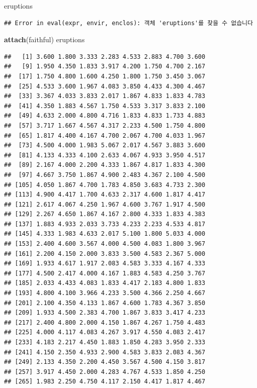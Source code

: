 \documentclass[11pt,]{krantz}
\makeatletter
\newenvironment{Shaded}{\begin{snugshade}}{\end{snugshade}}
\newcommand{\KeywordTok}[1]{\textcolor[rgb]{0.13,0.29,0.53}{\textbf{#1}}}
\newcommand{\NormalTok}[1]{#1}
\newenvironment{kframe}{%
\medskip{}
\setlength{\fboxsep}{.8em}
 \def\at@end@of@kframe{}%
 \ifinner\ifhmode%
  \def\at@end@of@kframe{\end{minipage}}%
  \begin{minipage}{\columnwidth}%
 \fi\fi%
 \def\FrameCommand##1{\hskip\@totalleftmargin \hskip-\fboxsep
 \colorbox{shadecolor}{##1}\hskip-\fboxsep
     \hskip-\linewidth \hskip-\@totalleftmargin \hskip\columnwidth}%
 \MakeFramed {\advance\hsize-\width
   \@totalleftmargin\z@ \linewidth\hsize
   \@setminipage}}%
 {\par\unskip\endMakeFramed%
 \at@end@of@kframe}
\renewenvironment{Shaded}{\begin{kframe}}{\end{kframe}}
\theoremstyle{definition}
\theoremstyle{definition}
\theoremstyle{remark}
\makeatother
\begin{document}
\begin{Shaded}
\begin{Highlighting}[]
\NormalTok{eruptions}
\end{Highlighting}
\end{Shaded}

\begin{verbatim}
## Error in eval(expr, envir, enclos): 객체 'eruptions'를 찾을 수 없습니다
\end{verbatim}

\begin{Shaded}
\begin{Highlighting}[]
\KeywordTok{attach}\NormalTok{(faithful)}
\NormalTok{eruptions}
\end{Highlighting}
\end{Shaded}

\begin{verbatim}
##   [1] 3.600 1.800 3.333 2.283 4.533 2.883 4.700 3.600
##   [9] 1.950 4.350 1.833 3.917 4.200 1.750 4.700 2.167
##  [17] 1.750 4.800 1.600 4.250 1.800 1.750 3.450 3.067
##  [25] 4.533 3.600 1.967 4.083 3.850 4.433 4.300 4.467
##  [33] 3.367 4.033 3.833 2.017 1.867 4.833 1.833 4.783
##  [41] 4.350 1.883 4.567 1.750 4.533 3.317 3.833 2.100
##  [49] 4.633 2.000 4.800 4.716 1.833 4.833 1.733 4.883
##  [57] 3.717 1.667 4.567 4.317 2.233 4.500 1.750 4.800
##  [65] 1.817 4.400 4.167 4.700 2.067 4.700 4.033 1.967
##  [73] 4.500 4.000 1.983 5.067 2.017 4.567 3.883 3.600
##  [81] 4.133 4.333 4.100 2.633 4.067 4.933 3.950 4.517
##  [89] 2.167 4.000 2.200 4.333 1.867 4.817 1.833 4.300
##  [97] 4.667 3.750 1.867 4.900 2.483 4.367 2.100 4.500
## [105] 4.050 1.867 4.700 1.783 4.850 3.683 4.733 2.300
## [113] 4.900 4.417 1.700 4.633 2.317 4.600 1.817 4.417
## [121] 2.617 4.067 4.250 1.967 4.600 3.767 1.917 4.500
## [129] 2.267 4.650 1.867 4.167 2.800 4.333 1.833 4.383
## [137] 1.883 4.933 2.033 3.733 4.233 2.233 4.533 4.817
## [145] 4.333 1.983 4.633 2.017 5.100 1.800 5.033 4.000
## [153] 2.400 4.600 3.567 4.000 4.500 4.083 1.800 3.967
## [161] 2.200 4.150 2.000 3.833 3.500 4.583 2.367 5.000
## [169] 1.933 4.617 1.917 2.083 4.583 3.333 4.167 4.333
## [177] 4.500 2.417 4.000 4.167 1.883 4.583 4.250 3.767
## [185] 2.033 4.433 4.083 1.833 4.417 2.183 4.800 1.833
## [193] 4.800 4.100 3.966 4.233 3.500 4.366 2.250 4.667
## [201] 2.100 4.350 4.133 1.867 4.600 1.783 4.367 3.850
## [209] 1.933 4.500 2.383 4.700 1.867 3.833 3.417 4.233
## [217] 2.400 4.800 2.000 4.150 1.867 4.267 1.750 4.483
## [225] 4.000 4.117 4.083 4.267 3.917 4.550 4.083 2.417
## [233] 4.183 2.217 4.450 1.883 1.850 4.283 3.950 2.333
## [241] 4.150 2.350 4.933 2.900 4.583 3.833 2.083 4.367
## [249] 2.133 4.350 2.200 4.450 3.567 4.500 4.150 3.817
## [257] 3.917 4.450 2.000 4.283 4.767 4.533 1.850 4.250
## [265] 1.983 2.250 4.750 4.117 2.150 4.417 1.817 4.467
\end{verbatim}
\end{document}
